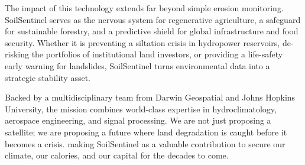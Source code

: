 \documentclass[11pt,letterpaper]{article}
\theoremstyle{plain}
\theoremstyle{definition}
\theoremstyle{remark}
\begin{document}
The impact of this technology extends far beyond simple erosion monitoring. SoilSentinel serves as the nervous system for regenerative agriculture, a safeguard for sustainable forestry, and a predictive shield for global infrastructure and food security. Whether it is preventing a siltation crisis in hydropower reservoirs, de-risking the portfolios of institutional land investors, or providing a life-safety early warning for landslides, SoilSentinel turns environmental data into a strategic stability asset.

Backed by a multidisciplinary team from Darwin Geospatial and Johns Hopkins University, the mission combines world-class expertise in hydroclimatology, aerospace engineering, and signal processing. We are not just proposing a satellite; we are proposing a future where land degradation is caught before it becomes a crisis. making SoilSentinel as a valuable contribution to secure our climate, our calories, and our capital for the decades to come.



\end{document}
